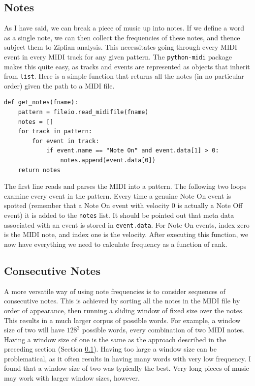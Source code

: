 \documentclass[10pt]{book}
\begin{document}
\subsection{Notes}
\label{sec:note_group}
As I have said, we can break a piece of music up into notes. If we define a word as a single note, we can then collect the frequencies of these notes, and thence subject them to Zipfian analysis. This necessitates going through every MIDI event in every MIDI track for any given pattern. The \texttt{python-midi} package makes this quite easy, as tracks and events are represented as objects that inherit from \texttt{list}. Here is a simple function that returns all the notes (in no particular order) given the path to a MIDI file.

\begin{verbatim}
def get_notes(fname):
    pattern = fileio.read_midifile(fname)
    notes = []
    for track in pattern:
        for event in track:
            if event.name == "Note On" and event.data[1] > 0:
                notes.append(event.data[0])
    return notes
\end{verbatim}

The first line reads and parses the MIDI into a pattern. The following two loops examine every event in the pattern. Every time a genuine Note On event is spotted (remember that a Note On event with velocity 0 is actually a Note Off event) it is added to the \texttt{notes} list. It should be pointed out that meta data associated with an event is stored in \texttt{event.data}. For Note On events, index zero is the MIDI note, and index one is the velocity. After executing this function, we now have everything we need to calculate frequency as a function of rank.


\subsection{Consecutive Notes}
A more versatile way of using note frequencies is to consider sequences of consecutive notes. This is achieved by sorting all the notes in the MIDI file by order of appearance, then running a sliding window of fixed size over the notes. This results in a much larger corpus of possible words. For example, a window size of two will have $128^2$ possible words, every combination of two MIDI notes. Having a window size of one is the same as the approach described in the preceding section (Section \ref{sec:note_group}). Having too large a window size can be problematical, as it often results in having many words with very low frequency. I found that a window size of two was typically the best. Very long pieces of music may work with larger window sizes, however.
\end{document}
